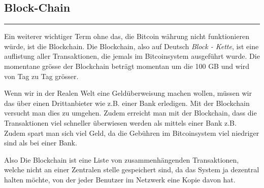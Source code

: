 \vspace*{1mm}
\subsection*{Block-Chain}
\vspace{-10mm}
\noindent\rule{0.8\textwidth}{0.4pt}

\vspace{5mm}

\noindent
Ein weiterer wichtiger Term ohne das, die Bitcoin währung nicht funktionieren würde, ist die Blockchain.
Die Blockchain, also auf Deutsch \emph{\dq Block - Kette\dq}, ist eine auflistung aller Transaktionen, die jemals im Bitcoinsystem ausgeführt wurde.
Die momentane grösse der Blockchain beträgt momentan um die 100 GB und wird von Tag zu Tag grösser.

\noindent
Wenn wir in der Realen Welt eine Geldüberweisung machen wollen, müssen wir das über einen Drittanbieter wie z.B. einer Bank erledigen. Mit der Blockchain
versucht man dies zu umgehen. Zudem erreicht man mit der Blockchain, dass die Transaktionen viel schneller überwiesen werden als mittels einer Bank z.B. Zudem
spart man sich viel Geld, da die Gebühren im Bitcoinsystem viel niedriger sind als bei einer Bank.

\noindent
Also Die Blockchain ist eine Liste von zusammenhängenden Transaktionen, welche nicht an  einer Zentralen stelle gespeichert sind, da das System ja dezentral halten möchte,
von der jeder Benutzer im Netzwerk eine Kopie davon hat.


\newpage
